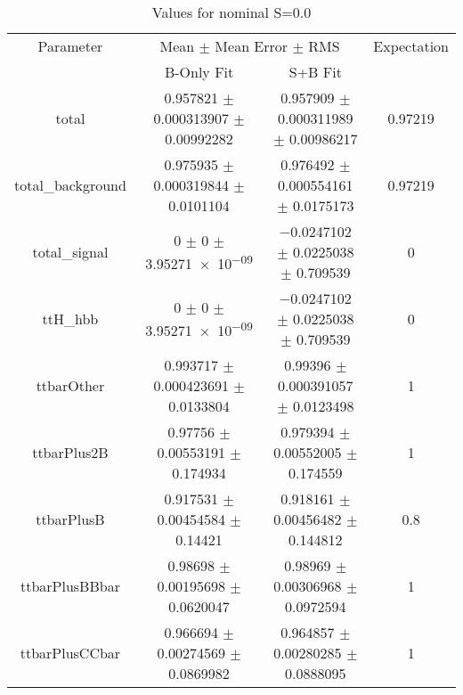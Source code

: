 \begin{table}
\centering
\caption{Values for nominal S=0.0}
\begin{tabular}{cccc}
\toprule
Parameter & \multicolumn{2}{c}{Mean $\pm$ Mean Error $\pm$ RMS} & Expectation\\
 & B-Only Fit & S+B Fit & \\
\midrule
total & \num{0.957821} $\pm$ \num{0.000313907} $\pm$ \num{0.00992282} & \num{0.957909} $\pm$ \num{0.000311989} $\pm$ \num{0.00986217} & \num{0.97219}\\
total\_background & \num{0.975935} $\pm$ \num{0.000319844} $\pm$ \num{0.0101104} & \num{0.976492} $\pm$ \num{0.000554161} $\pm$ \num{0.0175173} & \num{0.97219}\\
total\_signal & \num{0} $\pm$ \num{0} $\pm$ \num{3.95271e-09} & \num{-0.0247102} $\pm$ \num{0.0225038} $\pm$ \num{0.709539} & \num{0}\\
ttH\_hbb & \num{0} $\pm$ \num{0} $\pm$ \num{3.95271e-09} & \num{-0.0247102} $\pm$ \num{0.0225038} $\pm$ \num{0.709539} & \num{0}\\
ttbarOther & \num{0.993717} $\pm$ \num{0.000423691} $\pm$ \num{0.0133804} & \num{0.99396} $\pm$ \num{0.000391057} $\pm$ \num{0.0123498} & \num{1}\\
ttbarPlus2B & \num{0.97756} $\pm$ \num{0.00553191} $\pm$ \num{0.174934} & \num{0.979394} $\pm$ \num{0.00552005} $\pm$ \num{0.174559} & \num{1}\\
ttbarPlusB & \num{0.917531} $\pm$ \num{0.00454584} $\pm$ \num{0.14421} & \num{0.918161} $\pm$ \num{0.00456482} $\pm$ \num{0.144812} & \num{0.8}\\
ttbarPlusBBbar & \num{0.98698} $\pm$ \num{0.00195698} $\pm$ \num{0.0620047} & \num{0.98969} $\pm$ \num{0.00306968} $\pm$ \num{0.0972594} & \num{1}\\
ttbarPlusCCbar & \num{0.966694} $\pm$ \num{0.00274569} $\pm$ \num{0.0869982} & \num{0.964857} $\pm$ \num{0.00280285} $\pm$ \num{0.0888095} & \num{1}\\
\bottomrule
\end{tabular}
\end{table}